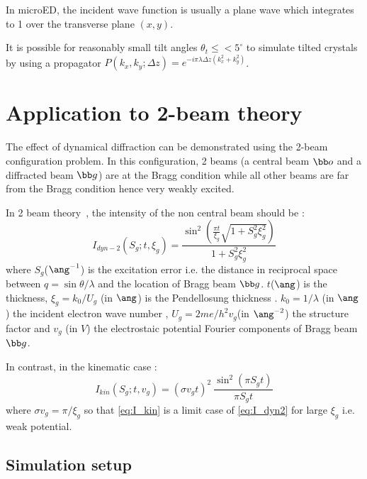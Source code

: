 In microED, the incident wave function is usually a plane wave which integrates to 1 over the transverse plane $(x,y)$.

It is possible for reasonably small tilt angles $\theta_t\leq<5^{\circ}$\cite{ChenDyck1997} to simulate tilted crystals\cite{Ishizuka1982,ChenDyck1997} by using a propagator $P(k_x,k_y;\Delta z)=e^{-i\pi\lambda\Delta z(k_x^2+k_y^2)}$.



\newpage
\section{Application to 2-beam theory}\label{chap:2_beam_theory}
The effect of dynamical diffraction can be demonstrated using the 2-beam configuration problem. In this configuration, 2 beams (a central beam $\bb o$ and a diffracted beam $\bb g$) are at the Bragg condition while all other beams are far from the Bragg condition hence very weakly excited.

In 2 beam theory~\cite{ZuoSpence2016}, the intensity of the non central beam should be :
\begin{equation}\label{eq:I_dyn2}
  I_{dyn-2}(S_g;t,\xi_g) =
    \frac{\sin^2\left(\frac{\pi t}{\xi_g}
    \sqrt{1+S_g^2\xi_g^2}\right)}{1+S_g^2\xi_g^2}
\end{equation}
where $S_g$($\ang^{-1}$) is the excitation error i.e. the distance in reciprocal space between $q=\sin\theta/\lambda$ and the location of Bragg beam $\bb g$.
$t$($\ang$) is the thickness,
$\xi_g=k_0/U_g$ (in $\ang$) is the Pendellosung thickness .
$k_0=1/\lambda$ (in $\ang$) the incident electron wave number ,
$U_g=2me/h^2 v_g$(in $\ang^{-2}$) the structure factor and $v_g$ (in $V$) the electrostaic potential Fourier components of Bragg beam $\bb g$.

In contrast, in the kinematic case :
\begin{equation}\label{eq:I_kin}
  I_{kin}(S_g;t,v_g) = \left(\sigma v_g t\right)^2\
  \frac{\sin^2\left(\pi S_gt\right)}{\pi S_g t}
\end{equation}
where $\sigma v_g=\pi/\xi_g$ so that \eqref{eq:I_kin} is a limit case of \eqref{eq:I_dyn2} for large $\xi_g$ i.e. weak potential.





\subsection{Simulation setup}

